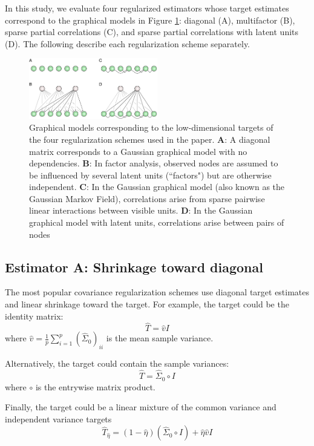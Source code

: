 In this study, we evaluate four regularized estimators whose target estimates correspond to the graphical models in Figure \ref{fig:02}: diagonal (A), multifactor (B), sparse partial correlations (C), and sparse  partial correlations with latent units (D).  The following describe each regularization scheme separately.

\begin{figure}[htp]
\centering
\includegraphics[width=0.5\textwidth]{figures/Figure2.pdf}
\caption{
Graphical models corresponding to the low-dimensional targets of the four regularization schemes used in the paper.
\textbf{A}: A diagonal matrix corresponds to a Gaussian graphical model with no dependencies. 
\textbf{B}: In factor analysis, observed nodes are assumed to be influenced by several latent units (``factors") but are otherwise independent. 
\textbf{C}: In the Gaussian graphical model (also known as the Gaussian Markov Field), correlations arise from sparse pairwise linear interactions between visible units. 
\textbf{D}: In the Gaussian graphical model with latent units, correlations arise  between pairs of nodes 
}\label{fig:02}
\end{figure}

\subsection{Estimator A: Shrinkage toward diagonal}
The most popular covariance regularization schemes use diagonal target estimates and linear shrinkage toward the target.  For example, the target could be the identity matrix:  
\begin{equation}
\hat T = \hat v I
\end{equation}
where $\hat v = \frac 1 p \sum\limits_{i=1}^p(\hat\Sigma_0)_{ii}$ is the mean sample variance. 

Alternatively, the target could contain the sample variances:
\begin{equation}
\hat T= \hat\Sigma_0 \circ I 
\end{equation}
where $\circ$ is the entrywise matrix product.

Finally, the target could be a linear mixture of the common variance and independent variance targets
\begin{equation}
\hat T_{\hat\eta} = (1-\hat\eta)(\hat\Sigma_0 \circ I) + \hat\eta\hat v I
\end{equation}

